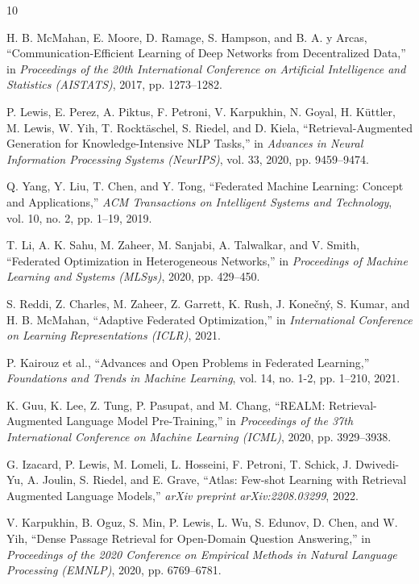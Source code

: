 \documentclass[acmsmall,screen]{acmart}
\begin{document}
\begin{thebibliography}{10}

H. B. McMahan, E. Moore, D. Ramage, S. Hampson, and B. A. y Arcas,
``Communication-Efficient Learning of Deep Networks from Decentralized Data,''
in \textit{Proceedings of the 20th International Conference on Artificial Intelligence and Statistics (AISTATS)}, 2017, pp. 1273--1282.

P. Lewis, E. Perez, A. Piktus, F. Petroni, V. Karpukhin, N. Goyal, H. Küttler, M. Lewis, W. Yih, T. Rocktäschel, S. Riedel, and D. Kiela,
``Retrieval-Augmented Generation for Knowledge-Intensive NLP Tasks,''
in \textit{Advances in Neural Information Processing Systems (NeurIPS)}, vol. 33, 2020, pp. 9459--9474.

Q. Yang, Y. Liu, T. Chen, and Y. Tong,
``Federated Machine Learning: Concept and Applications,''
\textit{ACM Transactions on Intelligent Systems and Technology}, vol. 10, no. 2, pp. 1--19, 2019.

T. Li, A. K. Sahu, M. Zaheer, M. Sanjabi, A. Talwalkar, and V. Smith,
``Federated Optimization in Heterogeneous Networks,''
in \textit{Proceedings of Machine Learning and Systems (MLSys)}, 2020, pp. 429--450.

S. Reddi, Z. Charles, M. Zaheer, Z. Garrett, K. Rush, J. Konečný, S. Kumar, and H. B. McMahan,
``Adaptive Federated Optimization,''
in \textit{International Conference on Learning Representations (ICLR)}, 2021.

P. Kairouz et al.,
``Advances and Open Problems in Federated Learning,''
\textit{Foundations and Trends in Machine Learning}, vol. 14, no. 1-2, pp. 1--210, 2021.

K. Guu, K. Lee, Z. Tung, P. Pasupat, and M. Chang,
``REALM: Retrieval-Augmented Language Model Pre-Training,''
in \textit{Proceedings of the 37th International Conference on Machine Learning (ICML)}, 2020, pp. 3929--3938.

G. Izacard, P. Lewis, M. Lomeli, L. Hosseini, F. Petroni, T. Schick, J. Dwivedi-Yu, A. Joulin, S. Riedel, and E. Grave,
``Atlas: Few-shot Learning with Retrieval Augmented Language Models,''
\textit{arXiv preprint arXiv:2208.03299}, 2022.

V. Karpukhin, B. Oguz, S. Min, P. Lewis, L. Wu, S. Edunov, D. Chen, and W. Yih,
``Dense Passage Retrieval for Open-Domain Question Answering,''
in \textit{Proceedings of the 2020 Conference on Empirical Methods in Natural Language Processing (EMNLP)}, 2020, pp. 6769--6781.


\end{thebibliography}
\end{document}
